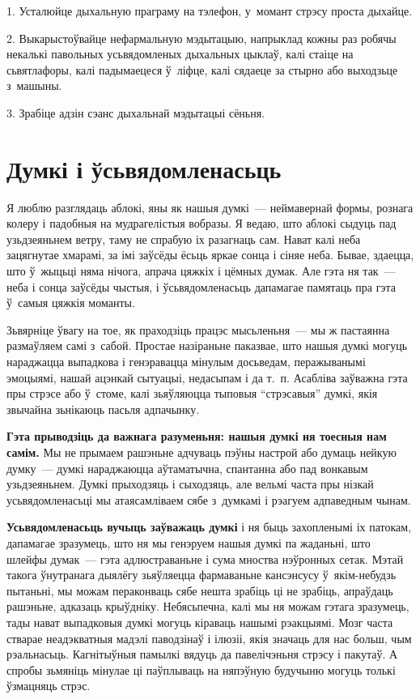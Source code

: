1. Усталюйце дыхальную праграму на тэлефон, у~момант стрэсу проста дыхайце.

2. Выкарыстоўвайце нефармальную мэдытацыю, напрыклад кожны раз робячы некалькі павольных усьвядомленых дыхальных цыклаў, калі стаіце на сьвятлафоры, калі падымаецеся ў~ліфце, калі сядаеце за стырно або выходзьце з~машыны.

3. Зрабіце адзін сэанс дыхальнай мэдытацыі сёньня.


\section{Думкі і ўсьвядомленасьць}

Я люблю разглядаць аблокі, яны як нашыя думкі~--- неймавернай формы, рознага колеру і падобныя на мудрагелістыя вобразы. Я ведаю, што аблокі сыдуць пад узьдзеяньнем ветру, таму не спрабую іх разагнаць сам. Нават калі неба зацягнутае хмарамі, за імі заўсёды ёсьць яркае сонца і сіняе неба. Бывае, здаецца, што ў~жыцьці няма нічога, апрача цяжкіх і цёмных думак. Але гэта ня так~--- неба і сонца заўсёды чыстыя, і ўсьвядомленасьць дапамагае памятаць пра гэта ў~самыя цяжкія моманты.


Зьвярніце ўвагу на тое, як праходзіць працэс мысьленьня~--- мы ж пастаянна размаўляем самі з~сабой. Простае назіраньне паказвае, што нашыя думкі могуць нараджацца выпадкова і генэравацца мінулым досьведам, перажыванымі эмоцыямі, нашай ацэнкай сытуацыі, недасыпам і да т.~п. Асабліва заўважна гэта пры стрэсе або ў~стоме, калі зьяўляюцца тыповыя ``стрэсавыя'' думкі, якія звычайна зьнікаюць пасьля адпачынку.

\textbf{Гэта прыводзіць да важнага разуменьня: нашыя думкі ня тоесныя нам самім.} Мы не прымаем рашэньне адчуваць пэўны настрой або думаць нейкую думку~--- думкі нараджаюцца аўтаматычна, спантанна або пад вонкавым узьдзеяньнем. Думкі прыходзяць і сыходзяць, але вельмі часта пры нізкай усьвядомленасьці мы атаясамліваем сябе з~думкамі і рэагуем адпаведным чынам.

\textbf{Усьвядомленасьць вучыць заўважаць думкі} і ня быць захопленымі іх патокам, дапамагае зразумець, што ня мы генэруем нашыя думкі па жаданьні, што шлейфы думак~--- гэта адлюстраваньне і сума мноства нэўронных сетак. Мэтай такога ўнутранага дыялёгу зьяўляецца фармаваньне кансэнсусу ў~якім-небудзь пытаньні, мы можам пераконваць сябе нешта зрабіць ці не зрабіць, апраўдаць рашэньне, адказаць крыўдніку. Небясьпечна, калі мы ня можам гэтага зразумець, тады нават выпадковыя думкі могуць кіраваць нашымі рэакцыямі. Мозг часта стварае неадэкватныя мадэлі паводзінаў і ілюзіі, якія значаць для нас больш, чым рэальнасьць. Кагнітыўныя памылкі вядуць да павелічэньня стрэсу і пакутаў. А спробы зьмяніць мінулае ці паўплываць на няпэўную будучыню могуць толькі ўзмацняць стрэс.

